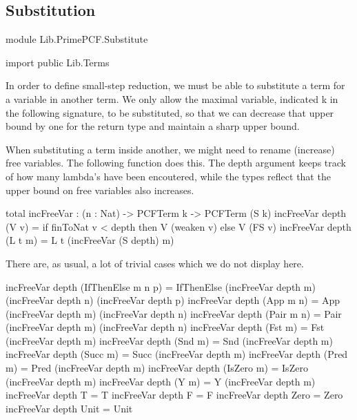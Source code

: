 \subsection{Substitution}

\begin{hidden}
module Lib.PrimePCF.Substitute

import public Lib.Terms
\end{hidden}

In order to define small-step reduction, we must be able to substitute a term
for a variable in another term.
We only allow the maximal variable, indicated k in the following signature, to be substituted,
so that we can decrease that upper bound by one for the return type and maintain a sharp upper bound.

When substituting a term inside another, we might need to rename (increase)
free variables. The following function does this.
The depth argument keeps track of how many lambda's have been encoutered,
while the types reflect that the upper bound on free variables also increases.

\begin{code}
total incFreeVar : (n : Nat) -> PCFTerm k -> PCFTerm (S k)
incFreeVar depth (V v)    = if finToNat v < depth
                              then V (weaken v)
                            else V (FS v)
incFreeVar depth (L t m)  = L t (incFreeVar (S depth) m)
\end{code}

There are, as usual, a lot of trivial cases which we do not display here.

\begin{hidden}
incFreeVar depth (IfThenElse m n p) = IfThenElse (incFreeVar depth m) (incFreeVar depth n) (incFreeVar depth p)
incFreeVar depth (App m n)          = App (incFreeVar depth m) (incFreeVar depth n)
incFreeVar depth (Pair m n)         = Pair (incFreeVar depth m) (incFreeVar depth n)
incFreeVar depth (Fst m)            = Fst (incFreeVar depth m)
incFreeVar depth (Snd m)            = Snd (incFreeVar depth m)
incFreeVar depth (Succ m)           = Succ (incFreeVar depth m)
incFreeVar depth (Pred m)           = Pred (incFreeVar depth m)
incFreeVar depth (IsZero m)         = IsZero (incFreeVar depth m)
incFreeVar depth (Y m)              = Y (incFreeVar depth m)
incFreeVar depth T                  = T
incFreeVar depth F                  = F
incFreeVar depth Zero               = Zero
incFreeVar depth Unit               = Unit
\end{hidden}

